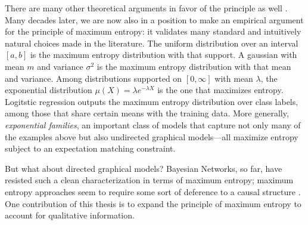 {There are many other theoretical arguments in favor of the principle as well \citep{wallis}.
Many decades later, we are now also in a position to make an empirical argument for the principle of maximum entropy: it validates many standard and intuitively natural choices made in the literature.
The uniform distribution over an interval $[a,b]$ is the maximum entropy distribution with that support. 
A gaussian with mean $m$ and variance $\sigma^2$ is the maximum entropy distribution with that mean and variance. 
Among distributions supported on $[0,\infty]$ with mean $\lambda$, the exponential distribution $\mu(X) = \lambda e^{-\lambda X}$ is the one that maximizes entropy. 
Logitstic regression 
    outputs the maximum entropy distribution over class labels,
    among those that share certain means with the training data.
More generally, \emph{exponential families}, an important class of models that capture not only many of the examples above but also undirected graphical models---all maximize entropy subject to an expectation matching constraint. 

But what about directed graphical models? Bayesian Networks, so far, have resisted such a clean characterization in terms of maximum entropy; maximum entropy approaches seem to require some sort of deference to a causal structure \citep{williamson2001foundations}. 
One contribution of this thesis is to expand the principle of maximum entropy to account for qualitative information. 
%
}%


